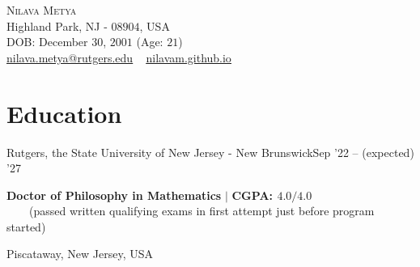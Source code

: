 
\usepackage{tabto}
\usepackage{setspace}
\usepackage{xcolor}
\newcommand*\circled[1]{\tikz[baseline=(char.base)]{
            \node[shape=circle,draw,inner sep=1pt, line width=1.1pt] (char) {#1};}}





\begin{center}
    {\Huge \scshape Nilava Metya} \\ \vspace{1pt}
    Highland Park, NJ - $08904$, USA\\
    DOB: December $30$, $2001$ (Age: $21$)\\ \vspace{1pt}
{\small 
\href{mailto:nilava.metya@rutgers.edu}{\circled{\scriptsize\faEnvelope}  \underline{nilava.metya@rutgers.edu}} ~ 
{\circled{\scriptsize\faHome} \underline{\url{nilavam.github.io}}}}
\end{center}



\section{Education}
\resumeSubheading
{Rutgers, the State University of New Jersey - New Brunswick}{Sep '22 -- (expected) '27}
{\begin{minipage}{15cm} \color{grey}\textbf{Doctor of Philosophy in Mathematics}  $|$ \textbf{CGPA: $4.0/4.0$}\\
$\phantom{\qquad}$(passed written qualifying exams in first attempt just before program started) \end{minipage}
}{Piscataway, New Jersey, USA}
\vspace{-5pt}

